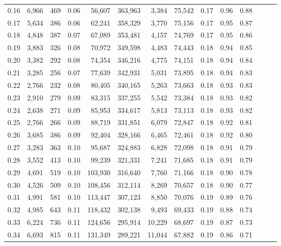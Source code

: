 \begin{tabular}{rrrrrrrrrrrrrr}
0.16 &  6,966 &    469 &  0.06 &   56,607 &  363,963 &   3,384 &  75,542 &  0.17 &  0.96 &      0.88 \\
0.17 &  5,634 &    386 &  0.06 &   62,241 &  358,329 &   3,770 &  75,156 &  0.17 &  0.95 &      0.87 \\
0.18 &  4,848 &    387 &  0.07 &   67,089 &  353,481 &   4,157 &  74,769 &  0.17 &  0.95 &      0.86 \\
0.19 &  3,883 &    326 &  0.08 &   70,972 &  349,598 &   4,483 &  74,443 &  0.18 &  0.94 &      0.85 \\
0.20 &  3,382 &    292 &  0.08 &   74,354 &  346,216 &   4,775 &  74,151 &  0.18 &  0.94 &      0.84 \\
0.21 &  3,285 &    256 &  0.07 &   77,639 &  342,931 &   5,031 &  73,895 &  0.18 &  0.94 &      0.83 \\
0.22 &  2,766 &    232 &  0.08 &   80,405 &  340,165 &   5,263 &  73,663 &  0.18 &  0.93 &      0.83 \\
0.23 &  2,910 &    279 &  0.09 &   83,315 &  337,255 &   5,542 &  73,384 &  0.18 &  0.93 &      0.82 \\
0.24 &  2,638 &    271 &  0.09 &   85,953 &  334,617 &   5,813 &  73,113 &  0.18 &  0.93 &      0.82 \\
0.25 &  2,766 &    266 &  0.09 &   88,719 &  331,851 &   6,079 &  72,847 &  0.18 &  0.92 &      0.81 \\
0.26 &  3,685 &    386 &  0.09 &   92,404 &  328,166 &   6,465 &  72,461 &  0.18 &  0.92 &      0.80 \\
0.27 &  3,283 &    363 &  0.10 &   95,687 &  324,883 &   6,828 &  72,098 &  0.18 &  0.91 &      0.79 \\
0.28 &  3,552 &    413 &  0.10 &   99,239 &  321,331 &   7,241 &  71,685 &  0.18 &  0.91 &      0.79 \\
0.29 &  4,691 &    519 &  0.10 &  103,930 &  316,640 &   7,760 &  71,166 &  0.18 &  0.90 &      0.78 \\
0.30 &  4,526 &    509 &  0.10 &  108,456 &  312,114 &   8,269 &  70,657 &  0.18 &  0.90 &      0.77 \\
0.31 &  4,991 &    581 &  0.10 &  113,447 &  307,123 &   8,850 &  70,076 &  0.19 &  0.89 &      0.76 \\
0.32 &  4,985 &    643 &  0.11 &  118,432 &  302,138 &   9,493 &  69,433 &  0.19 &  0.88 &      0.74 \\
0.33 &  6,224 &    736 &  0.11 &  124,656 &  295,914 &  10,229 &  68,697 &  0.19 &  0.87 &      0.73 \\
0.34 &  6,693 &    815 &  0.11 &  131,349 &  289,221 &  11,044 &  67,882 &  0.19 &  0.86 &      0.71 \\

\end{tabular}
